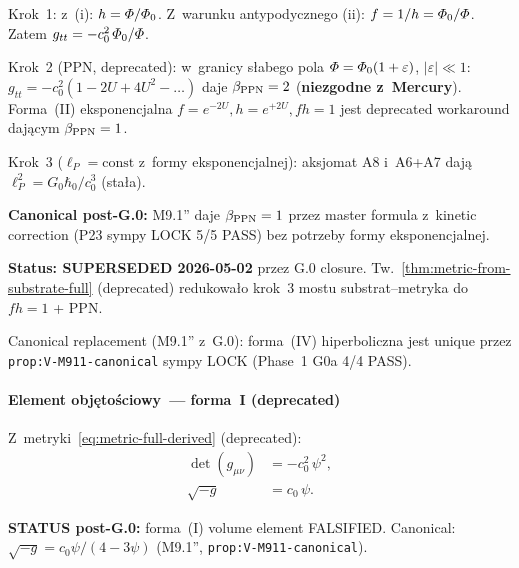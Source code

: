 Krok~1: z~(i): $h = \varPhi/\varPhi_0$. Z~warunku antypodycznego (ii):
$f = 1/h = \varPhi_0/\varPhi$. Zatem $g_{tt} = -c_0^2\,\varPhi_0/\varPhi$.

Krok~2 (PPN, deprecated): w~granicy s\l{}abego pola
$\varPhi = \varPhi_0(1 + \varepsilon)$, $|\varepsilon| \ll 1$:
$g_{tt} = -c_0^2(1 - 2U + 4U^2 - \ldots)$ daje $\beta_{\rm PPN} = 2$
(\textbf{niezgodne z~Mercury}). Forma~(II) eksponencjalna
$f = e^{-2U}, h = e^{+2U}, fh = 1$ jest deprecated workaround daj\k{a}cym
$\beta_{\rm PPN} = 1$.

Krok~3 ($\ell_P = \text{const}$ z~formy eksponencjalnej): aksjomat A8
i~A6+A7 dają $\ell_P^2 = G_0\hbar_0/c_0^3$ (stała).

\textbf{Canonical post-G.0:} M9.1'' daje $\beta_{\rm PPN}=1$ przez master
formula z~kinetic correction (P23 sympy LOCK 5/5 PASS) bez potrzeby
formy eksponencjalnej.

\begin{remark}%
\label{rem:step3-elimination}
\textbf{Status: SUPERSEDED 2026-05-02} przez G.0 closure.
Tw.~\ref{thm:metric-from-substrate-full} (deprecated) redukowa\l{}o krok~3
mostu substrat--metryka do $fh=1$ + PPN.

Canonical replacement (M9.1'' z~G.0): forma~(IV) hiperboliczna jest unique
przez \texttt{prop:V-M911-canonical} sympy LOCK (Phase~1 G0a 4/4 PASS).
\end{remark}

\paragraph{Element obj\k{e}to\'sciowy~--- forma~I (deprecated)}

Z~metryki~\eqref{eq:metric-full-derived} (deprecated):
\begin{align}
  \det(g_{\mu\nu})
  &= -c_0^2\,\psi^2, \nonumber\\[4pt]
  \sqrt{-g}
  &= c_0\,\psi.
  \label{eq:vol-element-derived}
\end{align}

\textbf{STATUS post-G.0:} forma~(I) volume element FALSIFIED.
Canonical: $\sqrt{-g}=c_0\psi/(4-3\psi)$ (M9.1'',
\texttt{prop:V-M911-canonical}).

